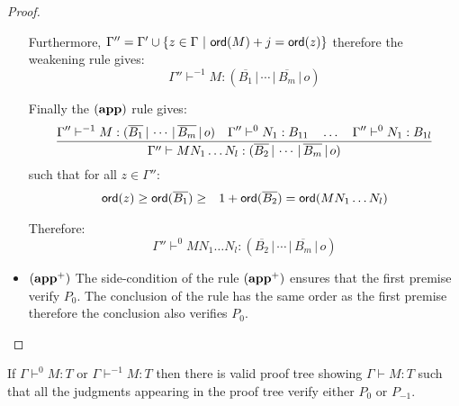 \begin{proof}
\begin{itemize}
    Furthermore, $\Gamma'' = \Gamma' \union \{ z \in \Gamma \ | \ \ord{M} + j = \ord{z}\}$ therefore
    the weakening rule gives:
    $$\Gamma'' \vdash^{-1} M : (\overline{B_1} \, | \, \cdots \, | \, \overline{B_m} \, | \, o)$$

    Finally the $\mathbf{(app)}$ rule gives:
    $$\frac{\displaystyle \Gamma'' \vdash^{-1} M : (\overline{B_1} \, | \, \cdots \, | \, \overline{B_m} \, | \, o)
    \quad \Gamma'' \vdash^0 N_1 : B_{11} \quad \ldots \quad \Gamma'' \vdash^0 N_1 : B_{1l}
    }{ \Gamma'' \vdash M N_1 \ldots N_l : (\overline{B_2} \, | \, \cdots \, | \,
            \overline{B_m} \, | \, o)}
    $$
    such that for all $z\in \Gamma''$:
    \begin{eqnarray*}
    {\sf ord}(z) \geq {\sf ord}(\overline{B_1})
    &\geq& 1 + {\sf ord}(\overline{B_2}) = {\sf ord}(M N_1 \ldots N_l)
    \end{eqnarray*}

    Therefore:
    $$\Gamma'' \vdash^0 M N_1 \ldots N_l : (\overline{B_2} \, | \, \cdots \, | \,
            \overline{B_m} \, | \, o)$$

\item $\mathbf{(app^+)}$  The side-condition of the rule $\mathbf{(app^+)}$ ensures that the first premise
 verify $P_0$. The conclusion of the rule has the same order as the first premise
 therefore the conclusion also verifies $P_0$.
\end{itemize}
\end{proof}


\begin{lem}
\label{lem:prooftree01only}
If $\Gamma \vdash^{0} M : T$ or $\Gamma \vdash^{-1} M : T$ then there is valid proof tree
showing $\Gamma \vdash M : T$ such that all the judgments
appearing in the proof tree verify either $P_0$ or $P_{-1}$.
\end{lem}


